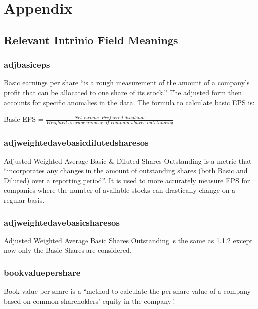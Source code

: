 \section{Appendix}
\subsection{Relevant Intrinio Field Meanings}

\subsubsection{adjbasiceps}
Basic earnings per share ``is a rough measurement of the amount of a company's profit that can be allocated to one share of its stock.''\cite{basicEarnings} The adjusted form then accounts for specific anomalies in the data. The formula to calculate basic EPS is: \newline 

Basic EPS = $ \frac{Net \, \, income – Preferred \, \, dividends}{Weighted \, \, average \, \, number \, \, of \, \, common \, \, shares \, \, outstanding}$

\subsubsection{adjweightedavebasicdilutedsharesos} \label{adjweightedavebasicdilutedsharesos}
Adjusted Weighted Average Basic \& Diluted Shares Outstanding is a metric that ``incorporates any changes in the amount of outstanding shares (both Basic and Diluted) over a reporting period''. It is used to more accurately measure EPS for companies where the number of available stocks can drastically change on a regular basis. \cite{weightedOutstandingShares}

\subsubsection{adjweightedavebasicsharesos}
Adjusted Weighted Average Basic Shares Outstanding is the same as \ref{adjweightedavebasicdilutedsharesos} except now only the Basic Shares are considered.

\subsubsection{bookvaluepershare}
Book value per share is a ``method to calculate the per-share value of a company based on common shareholders' equity in the company''. \newline

